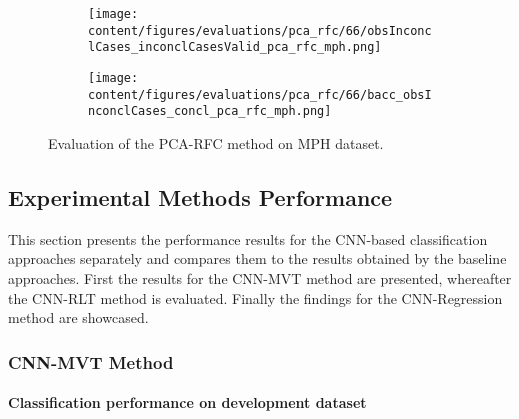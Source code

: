 \begin{figure}[ht]
  \begin{subfigure}{0.49\textwidth}
    \centering
    \texttt{[image: content/figures/evaluations/pca\_rfc/66/obsInconclCases\_inconclCasesValid\_pca\_rfc\_mph.png]}
    \label{fig:obsInconclCases_inconclCasesValid_pca_rfc_mph}
  \end{subfigure}
  \hfill
  \begin{subfigure}{0.49\textwidth}
    \centering
    \texttt{[image: content/figures/evaluations/pca\_rfc/66/bacc\_obsInconclCases\_concl\_pca\_rfc\_mph.png]}
    \label{fig:bacc_obsInconclCases_concl_pca_rfc_mph}
  \end{subfigure}
  \caption{Evaluation of the PCA-RFC method on MPH dataset.}
  \label{fig:perf_results_rfc_mph}
\end{figure}


\subsection{Experimental Methods Performance}
\label{subsec:exp_methods_perf}

This section presents the performance results for the CNN-based classification approaches separately and compares them 
to the results obtained by the baseline approaches.
First the results for the CNN-MVT method are presented, whereafter the CNN-RLT method is evaluated.
Finally the findings for the CNN-Regression method are showcased.

\subsubsection{CNN-MVT Method}
\label{subsubsec:eval_mvt}


\paragraph{Classification performance on development dataset}

